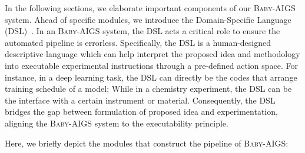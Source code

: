 \documentclass{article} %
\newcommand{\AIGSSys}{\textsc{Baby-AIGS}\xspace}
\newcommand{\ProposalAgent}{\textsc{ProposalAgent}\xspace}
\newcommand{\ExperimentAgent}{\textsc{ExpAgent}\xspace}
\newcommand{\ReviewAgent}{\textsc{ReviewAgent}\xspace}
\newcommand{\FalsificationAgent}{\textsc{FalsificationAgent}\xspace}
\newcommand{\DSL}{\textsc{DSL}\xspace}
\begin{document}
In the following sections, we elaborate important components of our \AIGSSys system. Ahead of specific modules, we introduce the Domain-Specific Language (\DSL)~\citep{10.1145/1118890.1118892}. In an \AIGSSys system, the \DSL acts a critical role to ensure the automated pipeline is errorless. Specifically, the \DSL is a human-designed descriptive language which can help interpret the proposed idea and methodology into executable experimental instructions through a pre-defined action space. For instance, in a deep learning task, the \DSL can directly be the codes that arrange training schedule of a model; While in a chemistry experiment, the \DSL can be the interface with a certain instrument or material. Consequently, the \DSL bridges the gap between formulation of proposed idea and experimentation, aligning the \AIGSSys system to the executability principle.

Here, we briefly depict the modules that construct the pipeline of \AIGSSys: 

\end{document}
